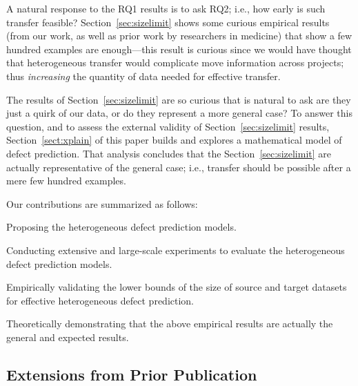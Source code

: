 A natural response to the RQ1 results is to ask RQ2; i.e., how early is such transfer
feasible?  Section~\ref{sec:sizelimit} shows some curious empirical results (from our
work, as well as prior work by researchers in medicine) that show a few hundred examples are enough---this result is curious since we would have thought that
heterogeneous transfer would complicate move information across projects;
thus {\em increasing} the quantity of data needed for effective transfer.

The results of Section~\ref{sec:sizelimit} are so curious that is natural to ask are they just a quirk of our data, or do they represent a more general case? To answer this question, and to assess the external validity of Section~\ref{sec:sizelimit} results, Section~\ref{sect:xplain} of this paper builds and explores a mathematical model of defect prediction.
That analysis concludes that the Section~\ref{sec:sizelimit} are actually representative of the general case; i.e., transfer should be possible after a mere few hundred examples. 



Our contributions are summarized as follows:
\squishlist
  \item Proposing the heterogeneous defect prediction models.
  \item Conducting extensive and large-scale experiments to evaluate
  the heterogeneous defect prediction models.
  \item Empirically validating the lower bounds of the size of source and target datasets for effective heterogeneous defect prediction.
  \item Theoretically demonstrating that the above empirical results are actually
  the general and expected results.
\squishend


\subsection{Extensions from Prior Publication}


